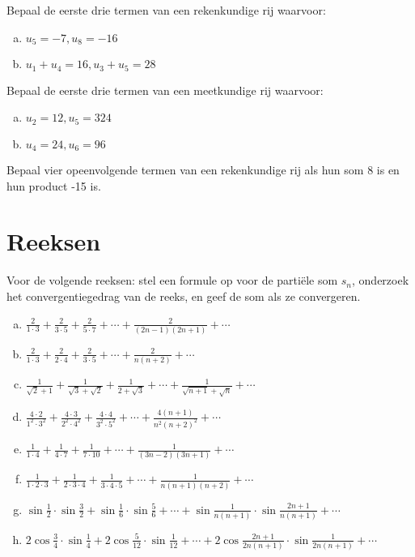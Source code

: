 \documentclass[12pt,twoside]{article}
\begin{document}
\begin{oefening}
Bepaal de eerste drie termen van een rekenkundige rij waarvoor:
\begin{enumerate}[(a)]
  \item $u_5=-7, u_8=-16$
  \item $u_1+u_4=16, u_3+u_5=28$
\end{enumerate}
\end{oefening}

\begin{oefening}
Bepaal de eerste drie termen van een meetkundige rij waarvoor:
\begin{enumerate}[(a)]
  \item $u_2=12, u_5=324$
  \item $u_4=24, u_6=96$
\end{enumerate}
\end{oefening}

\begin{oefening}
Bepaal vier opeenvolgende termen van een rekenkundige rij als hun som 8 is en hun product -15 is.
\end{oefening}

\section{Reeksen}

\begin{oefening}
Voor de volgende reeksen: stel een formule op voor de partiële som $s_n$, onderzoek het convergentiegedrag van de reeks, en geef de som als ze convergeren.
\begin{enumerate}[(a)]
  \item $\frac{2}{1\cdot 3} + \frac{2}{3\cdot 5} + \frac{2}{5\cdot 7} + \cdots + \frac{2}{(2n-1)(2n+1)} + \cdots$
  \item $\frac{2}{1\cdot 3} + \frac{2}{2\cdot 4} + \frac{2}{3\cdot 5} + \cdots + \frac{2}{n(n+2)} + \cdots$
  \item $\frac{1}{\sqrt{2}+1} + \frac{1}{\sqrt{3}+\sqrt{2}} + \frac{1}{2+\sqrt{3}} + \cdots + \frac{1}{\sqrt{n+1}+\sqrt{n}} + \cdots$
  \item $\frac{4\cdot2}{1^2\cdot 3^2} + \frac{4\cdot3}{2^2\cdot 4^2} + \frac{4\cdot4}{3^2\cdot 5^2} + \cdots + \frac{4(n+1)}{n^2(n+2)^2} + \cdots$
  \item $\frac{1}{1\cdot 4} + \frac{1}{4\cdot 7} + \frac{1}{7\cdot 10} + \cdots + \frac{1}{(3n-2)(3n+1)} + \cdots$
  \item $\frac{1}{1\cdot2\cdot3} + \frac{1}{2\cdot3\cdot4} + \frac{1}{3\cdot4\cdot5} + \cdots + \frac{1}{n(n+1)(n+2)} + \cdots$
  \item $\sin\frac{1}{2}\cdot\sin\frac{3}{2} + \sin\frac{1}{6}\cdot\sin\frac{5}{6} + \cdots + \sin\frac{1}{n(n+1)}\cdot\sin\frac{2n+1}{n(n+1)} + \cdots$
  \item $2\cos\frac{3}{4}\cdot\sin\frac{1}{4} + 2\cos\frac{5}{12}\cdot\sin\frac{1}{12} + \cdots + 2\cos\frac{2n+1}{2n(n+1)}\cdot\sin\frac{1}{2n(n+1)} + \cdots$
\end{enumerate}
\end{oefening}
\end{document}
